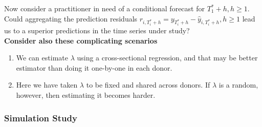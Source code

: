\documentclass[11pt]{article}
\theoremstyle{definition}
\begin{document}
Now consider a practitioner in need of a conditional forecast for $T_{1}^{*}+h, h\geq 1$.  Could aggregating the prediction residuals $r_{i,T_{i}^{*}+h} = y_{T_{i}^{*}+h}-\hat y_{i, T_{i}^{*}+h}, h\geq 1$ lead us to a superior predictions in the time series under study?\\

\textbf{Consider also these complicating scenarios}
\begin{enumerate}
  \item We can estimate $\lambda$ using a cross-sectional regression, and that may be better estimator than doing it one-by-one in each donor.
  \item Here we have taken $\lambda$ to be fixed and shared across donors.  If $\lambda$ is a random, however, then estimating it becomes harder.
\end{enumerate}

\subsubsection{Simulation Study}
\end{document}
